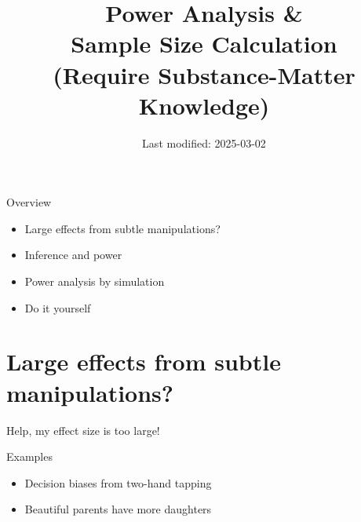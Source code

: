 \documentclass[aspectratio=169]{beamer}
\begin{document}
\title{Power Analysis \&\\
       Sample Size Calculation\\[2ex]

\small (Require Substance-Matter Knowledge)}

\author{}
\date{Last modified: 2025-03-02}

\begin{frame}
\thispagestyle{empty}
\titlepage
\end{frame}


%


\begin{frame}{Overview}

\begin{itemize}
\item Large effects from subtle manipulations?
\item Inference and power
\item Power analysis by simulation
\item Do it yourself
\end{itemize}

\end{frame}



\section{Large effects from subtle manipulations?}


\begin{frame}{Help, my effect size is too large!}

Examples
\begin{itemize}
\item Decision biases from two-hand tapping
\item Beautiful parents have more daughters
\end{itemize}

\end{frame}
\end{document}
